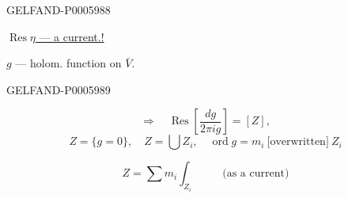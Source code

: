\begin{GelfandAdjacentEvidence}{GELFAND-P000598}{8}


\underline{\(\operatorname{Res}\eta\) — a current.!}

\(g\) — holom. function on \(\bar V\).
\end{GelfandAdjacentEvidence}
\begin{GelfandAdjacentEvidence}{GELFAND-P000598}{9}

\[
\Rightarrow\quad\operatorname{Res}\left[\frac{dg}{2\pi ig}\right]=[Z],
\]
\[
Z=\{g=0\},\quad Z=\bigcup Z_i,\quad\operatorname{ord}g=m_i\ \text{[overwritten]}\ Z_i
\]
\end{GelfandAdjacentEvidence}

\[
Z=\sum m_i\int_{Z_i}\qquad\text{(as a current)}
\]


